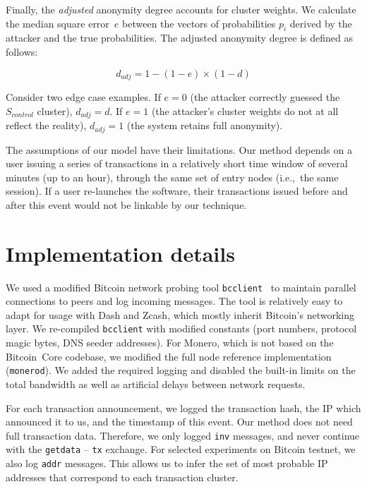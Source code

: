 Finally, the \textit{adjusted} anonymity degree accounts for cluster weights.
We calculate the median square error~$e$ between the vectors of probabilities $p_i$ derived by the attacker and the true probabilities.
The adjusted anonymity degree is defined as follows:

\[
d_{adj} = 1 - (1 - e) \times (1 - d)
\]

Consider two edge case examples.
If $e = 0$ (the attacker correctly guessed the~$S_{control}$ cluster), $d_{adj} = d$.
If $e = 1$ (the attacker's cluster weights do not at all reflect the reality), $d_{adj} = 1$ (the system retains full anonymity).

The assumptions of our model have their limitations.
Our method depends on a user issuing a series of transactions in a relatively short time window of several minutes (up to an hour), through the same set of entry nodes (i.e.,~the same session).
If a user re-launches the software, their transactions issued before and after this event would not be linkable by our technique.


\section{Implementation details}

We used a modified Bitcoin network probing tool \texttt{bcclient}~\cite{Pustogarov2017} to maintain parallel connections to peers and log incoming messages.
The tool is relatively easy to adapt for usage with Dash and Zcash, which mostly inherit Bitcoin's networking layer.
We re-compiled \texttt{bcclient} with modified constants (port numbers, protocol magic bytes, DNS seeder addresses).
For Monero, which is not based on the Bitcoin~Core codebase, we modified the full node reference implementation (\texttt{monerod}).
We added the required logging and disabled the built-in limits on the total bandwidth as well as artificial delays between network requests.

For each transaction announcement, we logged the transaction hash, the IP which announced it to us, and the timestamp of this event.
Our method does not need full transaction data.
Therefore, we only logged \texttt{inv} messages, and never continue with the \texttt{getdata} -- \texttt{tx} exchange.
For selected experiments on Bitcoin testnet, we also log \texttt{addr} messages.
This allows us to infer the set of most probable IP addresses that correspond to each transaction cluster.

